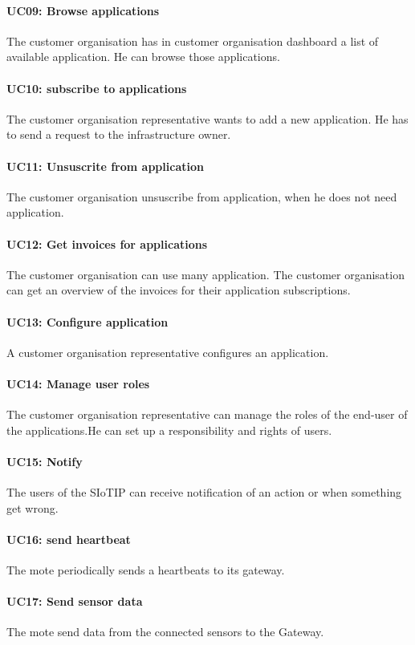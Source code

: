 \paragraph{UC09: Browse applications}
The customer organisation has in customer organisation dashboard a list of available
application. He can browse those applications.
\paragraph{UC10: subscribe to applications}
The customer organisation representative wants to add a new application. He has
to send a request to the infrastructure owner.
\paragraph{UC11: Unsuscrite from application}
The customer organisation unsuscribe from application, when he does not need application.
\paragraph{UC12: Get invoices for applications }
The customer organisation can use many application. The customer organisation can get an overview of the invoices for their application subscriptions.
\paragraph{UC13: Configure application}
A customer organisation representative configures an application.
\paragraph{UC14: Manage user roles}
The customer organisation representative can manage the roles of the end-user of the applications.He can set up a responsibility and rights of users.
\paragraph{UC15: Notify}
The users of the SIoTIP can receive notification of an action or when something get
wrong.
\paragraph{UC16: send heartbeat}
The mote  periodically sends a heartbeats to its gateway.
\paragraph{UC17: Send sensor data}
The mote send data from the connected sensors to the Gateway.
